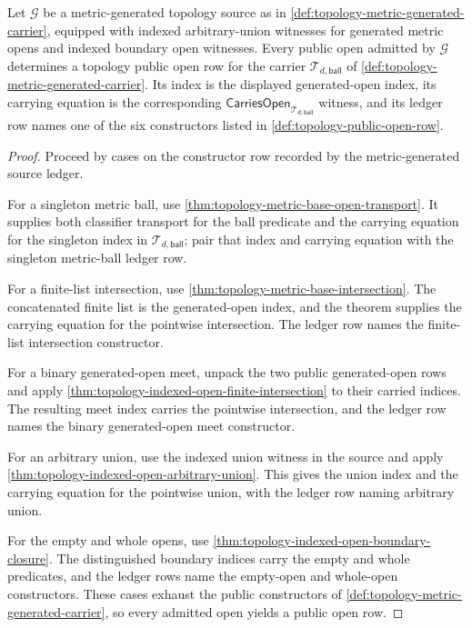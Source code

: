 \begin{theorem}
\label{thm:topology-metric-generated-public-open-row-coverage}
Let $\mathcal{G}$ be a metric-generated topology source as in \autoref{def:topology-metric-generated-carrier}, equipped with indexed arbitrary-union witnesses for generated metric opens and indexed boundary open witnesses. Every public open admitted by $\mathcal{G}$ determines a topology public open row for the carrier $\mathcal{T}_{d,\mathsf{ball}}$ of \autoref{def:topology-metric-generated-carrier}. Its index is the displayed generated-open index, its carrying equation is the corresponding $\mathsf{CarriesOpen}_{\mathcal{T}_{d,\mathsf{ball}}}$ witness, and its ledger row names one of the six constructors listed in \autoref{def:topology-public-open-row}.
\end{theorem}
\begin{proof}
Proceed by cases on the constructor row recorded by the metric-generated source ledger.

For a singleton metric ball, use \autoref{thm:topology-metric-base-open-transport}. It supplies both classifier transport for the ball predicate and the carrying equation for the singleton index in $\mathcal{T}_{d,\mathsf{ball}}$; pair that index and carrying equation with the singleton metric-ball ledger row.

For a finite-list intersection, use \autoref{thm:topology-metric-base-intersection}. The concatenated finite list is the generated-open index, and the theorem supplies the carrying equation for the pointwise intersection. The ledger row names the finite-list intersection constructor.

For a binary generated-open meet, unpack the two public generated-open rows and apply \autoref{thm:topology-indexed-open-finite-intersection} to their carried indices. The resulting meet index carries the pointwise intersection, and the ledger row names the binary generated-open meet constructor.

For an arbitrary union, use the indexed union witness in the source and apply \autoref{thm:topology-indexed-open-arbitrary-union}. This gives the union index and the carrying equation for the pointwise union, with the ledger row naming arbitrary union.

For the empty and whole opens, use \autoref{thm:topology-indexed-open-boundary-closure}. The distinguished boundary indices carry the empty and whole predicates, and the ledger rows name the empty-open and whole-open constructors. These cases exhaust the public constructors of \autoref{def:topology-metric-generated-carrier}, so every admitted open yields a public open row.
\end{proof}

